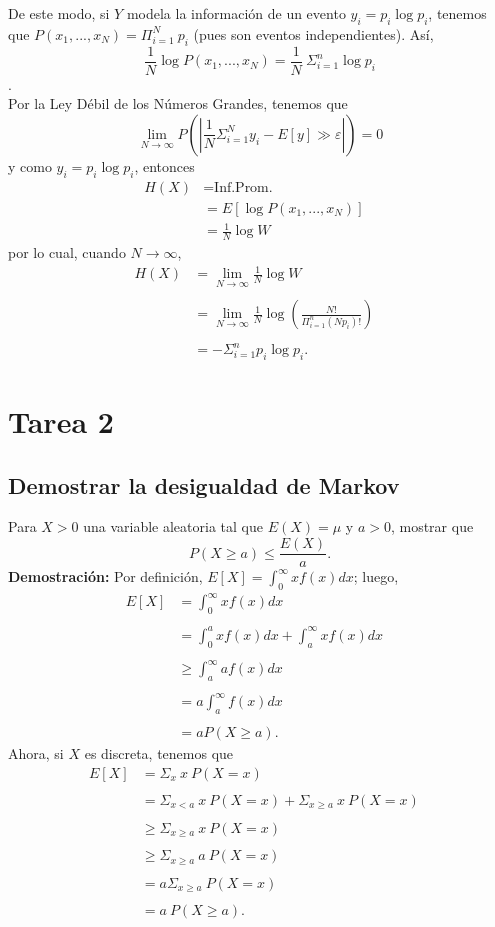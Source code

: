 \documentclass{article}
\begin{document}
De este modo, si $Y$ modela la información de un evento $y_i = p_i \log p_i$, tenemos que $P(x_1,...,x_N) = \Pi_{i=1}^N \ p_i$ (pues son eventos independientes). Así, \[ \frac{1}{N} \log P(x_1,...,x_N) = \frac{1}{N} \ \Sigma_{i=1}^n \log p_i\]. \\
Por la Ley Débil de los Números Grandes, tenemos que \[ \lim_{N \rightarrow \infty} P \left( \left| \frac{1}{N} \Sigma_{i=1}^N y_i - E[y] \gg \varepsilon \right| \right) =0 \] y como $y_i = p_i \log p_i$, entonces
\begin{align*}
    H(X) &= \text{Inf.Prom.} &\\
    &= E[\log P(x_1,...,x_N)] &\\
    &= \frac{1}{N} \log W
\end{align*}
por lo cual, cuando $N \to \infty$,
\begin{align*}
    H(X) &= \lim_{N \to \infty} \frac{1}{N} \log W &\\ \\
    &= \lim_{N \to \infty} \frac{1}{N} \log \left( \frac{N!}{\Pi_{i=1}^n  (Np_i)!} \right) &\\ \\
    &= - \Sigma_{i=1}^n p_i \log p_i.
\end{align*}
\section{Tarea 2}
\subsection{Demostrar la desigualdad de Markov}
\noindent Para $X>0$ una variable aleatoria tal que $E(X) = \mu$ y $a >0$, mostrar que \[P(X \geq a) \leq \frac{E(X)}{a}.\]
\textbf{Demostración:} Por definición, $E[X] = \int_0^\infty x f(x) dx $; luego,
\begin{align*}
    E[X] &= \int_0^\infty x f(x) dx &\\ \\
    &= \int_0^a x f(x) dx + \int_a^\infty x f(x) dx &\\ \\
    & \geq \int_a^\infty a f(x) dx &\\ \\
    &= a \int_a^\infty f(x) dx &\\ \\
    &= a P(X \geq a).
\end{align*}
Ahora, si $X$ es discreta, tenemos que
\begin{align*}
    E[X] &= \Sigma_x \ x \ P(X = x) &\\ \\
    &= \Sigma_{x<a} \ x \ P(X = x) + \Sigma_{x \geq a} \ x \ P(X = x)  &\\ \\
    & \geq \Sigma_{x \geq a} \ x \ P(X=x) &\\ \\
    & \geq \Sigma_{x \geq a} \ a \ P(X=x) &\\ \\
    &= a \Sigma_{x \geq a} \ P(X=x) &\\ \\
    &= a \ P(X\geq a).
\end{align*}
\end{document}
